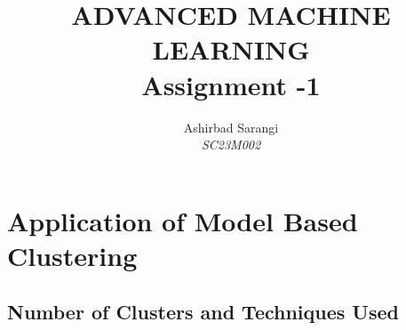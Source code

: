 \documentclass[12pt]{article}
\title{ ADVANCED MACHINE LEARNING \\ Assignment -1 }
\author{Ashirbad Sarangi \\ \textit{SC23M002}}
\date{}
\begin{document}
\maketitle

\section{Application of Model Based Clustering}

\subsection{Number of Clusters and Techniques Used}
\end{document}
